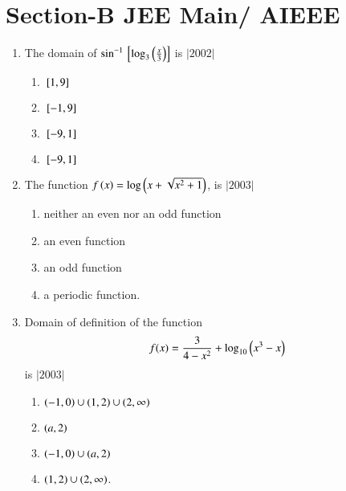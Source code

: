 \documentclass[journal,12pt,twocolumn,article]{IEEEtran}
\theoremstyle{remark}
\begin{document}
   \section*{Section-B JEE Main/ AIEEE}
	  \begin{enumerate}
		  \item The domain of $\sin^{-1}{}\left[\log_3\left(\frac{x}{3}\right)\right]$ is 
			  \hfill$|2002|$
			  \begin{enumerate}
				  \item ${}\left[1,9\right]$    
				  \item ${}\left[-1,9\right]$    
				  \item ${}\left[-9,1\right]$     
				  \item ${}\left[-9,1\right]$
			  \end{enumerate}
		  \item The function $f\left(x\right)=\log\left(x+\sqrt{x^2+1}\right)$, is 
			  \hfill$|2003|$
			  \begin{enumerate}
		  \item neither an even nor an odd function
		  \item an even function
		  \item an odd function
		  \item a periodic function.
			  \end{enumerate}
		  \item Domain of definition of the function 
			  \begin{align*}
				  f(x)=\frac{3}{4-x^2}+\log_{10}\left(x^3-x\right)
			  \end{align*}
			  is 
			  \hfill$|2003|$
			  \begin{enumerate}
				  \item $\left(-1,0\right)\cup\left(1,2\right)\cup\left(2,\infty\right)$     
				  \item $\left(a,2\right)$
				  \item $\left(-1,0\right)\cup\left(a,2\right)$                   
				  \item $\left(1,2\right)\cup\left(2,\infty\right)$.
			  \end{enumerate}
	  \end{enumerate}
\end{document}
